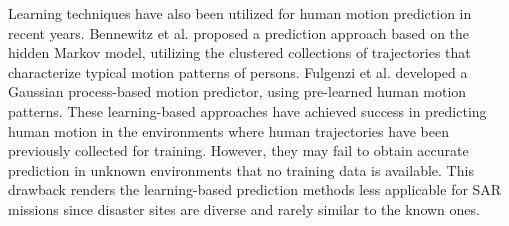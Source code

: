 \documentclass[letterpaper, 10 pt, conference]{ieeeconf}
\newcommand{\todohere}[1]{\hl{(\textbf{TODO:} #1)}}
\begin{document}
	Learning techniques have also been utilized for human motion prediction in recent years. 
	Bennewitz et al. \cite{bennewitz2005learning} proposed a prediction approach based on the hidden Markov model, utilizing the clustered collections of trajectories that characterize typical motion patterns of persons.
	Fulgenzi et al. \cite{fulgenzi2008probabilistic} developed a Gaussian process-based motion predictor, using pre-learned human motion patterns.
	These learning-based approaches have achieved success in predicting human motion in the environments where human trajectories have been previously collected for training.
	However, they may fail to obtain accurate prediction in unknown environments that no training data is available.
	This drawback renders the learning-based prediction methods less applicable for SAR missions since disaster sites are diverse and rarely similar to the known ones.
	
\end{document}
